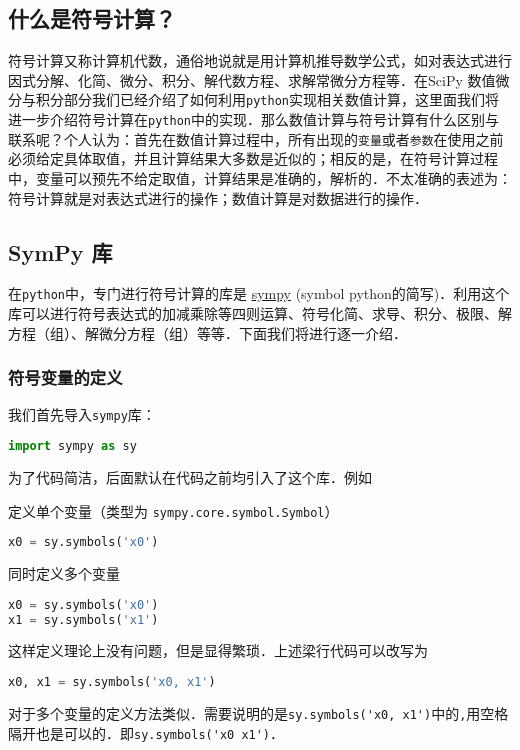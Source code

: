 
\subsection{什么是符号计算？}
符号计算又称计算机代数，通俗地说就是用计算机推导数学公式，如对表达式进行因式分解、化简、微分、积分、解代数方程、求解常微分方程等．在SciPy 数值微分与积分部分我们已经介绍了如何利用\verb|python|实现相关数值计算，这里面我们将进一步介绍符号计算在\verb|python|中的实现．那么数值计算与符号计算有什么区别与联系呢？个人认为：首先在数值计算过程中，所有出现的\verb|变量|或者\verb|参数|在使用之前必须给定具体取值，并且计算结果大多数是近似的；相反的是，在符号计算过程中，变量可以预先不给定取值，计算结果是准确的，解析的．不太准确的表述为：符号计算就是对表达式进行的操作；数值计算是对数据进行的操作．

\subsection{SymPy 库}
在\verb|python|中，专门进行符号计算的库是 \href{https://www.sympy.org/en/index.html}{sympy} (symbol python的简写)．利用这个库可以进行符号表达式的加减乘除等四则运算、符号化简、求导、积分、极限、解方程（组）、解微分方程（组）等等．下面我们将进行逐一介绍．

\subsubsection{符号变量的定义}
我们首先导入\verb|sympy|库：
\begin{lstlisting}[language=python]
import sympy as sy
\end{lstlisting}
为了代码简洁，后面默认在代码之前均引入了这个库．例如

定义单个变量（类型为 \verb|sympy.core.symbol.Symbol|）
\begin{lstlisting}[language=python]
x0 = sy.symbols('x0')
\end{lstlisting}
同时定义多个变量
\begin{lstlisting}[language=python]
x0 = sy.symbols('x0')
x1 = sy.symbols('x1')
\end{lstlisting}
这样定义理论上没有问题，但是显得繁琐．上述梁行代码可以改写为
\begin{lstlisting}[language=python]
x0, x1 = sy.symbols('x0, x1')
\end{lstlisting}
对于多个变量的定义方法类似．需要说明的是\verb|sy.symbols('x0, x1')|中的\verb|,|用空格隔开也是可以的．即\verb|sy.symbols('x0 x1')|．

